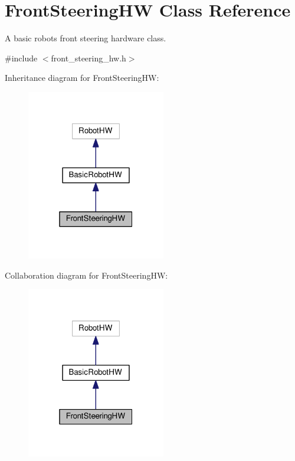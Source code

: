\hypertarget{classFrontSteeringHW}{}\section{Front\+Steering\+HW Class Reference}
\label{classFrontSteeringHW}


A basic robot\textquotesingle{}s front steering hardware class.  




{\ttfamily \#include $<$front\+\_\+steering\+\_\+hw.\+h$>$}



Inheritance diagram for Front\+Steering\+HW\+:
\nopagebreak
\begin{figure}[H]
\begin{center}
\leavevmode
\includegraphics[width=172pt]{classFrontSteeringHW__inherit__graph}
\end{center}
\end{figure}


Collaboration diagram for Front\+Steering\+HW\+:
\nopagebreak
\begin{figure}[H]
\begin{center}
\leavevmode
\includegraphics[width=172pt]{classFrontSteeringHW__coll__graph}
\end{center}
\end{figure}
